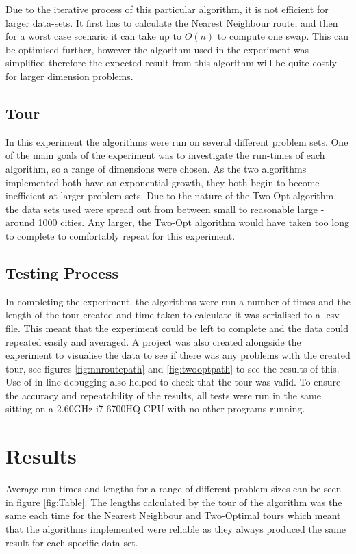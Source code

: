 \documentclass[10pt, a4paper]{article}
\begin{document}
	Due to the iterative process of this particular algorithm, it is not efficient for larger data-sets. It first has to calculate the Nearest Neighbour route, and then for a worst case scenario it can take up to $O(n)$ to compute one swap. This can be optimised further, however the algorithm used in the experiment was simplified therefore the expected result from this algorithm will be quite costly for larger dimension problems. \cite{two}	
	
	\subsection{Tour}
	
	In this experiment the algorithms were run on several different problem sets. One of the main goals of the experiment was to investigate the run-times of each algorithm, so a range of dimensions were chosen.	As the two algorithms implemented both have an exponential growth, they both begin to become inefficient at larger problem sets. Due to the nature of the Two-Opt algorithm, the data sets used were spread out from between small to reasonable large - around 1000 cities. Any larger, the Two-Opt algorithm would have taken too long to complete to comfortably repeat for this experiment.
	
	\subsection{Testing Process}
	
	In completing the experiment, the algorithms were run a number of times and the length of the tour created and time taken to calculate it was serialised to a .csv file. This meant that the experiment could be left to complete and the data could repeated easily and averaged. A project was also created alongside the experiment to visualise the data to see if there was any problems with the created tour, see figures \ref{fig:nnroutepath} and \ref{fig:twooptpath} to see the results of this. Use of in-line debugging also helped to check that the tour was valid. To ensure the accuracy and repeatability of the results, all tests were run in the same sitting on a 2.60GHz i7-6700HQ CPU with no other programs running.
	
	\section{Results}
	
	Average run-times and lengths for a range of different problem sizes can be seen in figure \ref{fig:Table}. The lengths calculated by the tour of the algorithm was the same each time for the Nearest Neighbour and Two-Optimal tours which meant that the algorithms implemented were reliable as they always produced the same result for each specific data set. 
	
\end{document}
